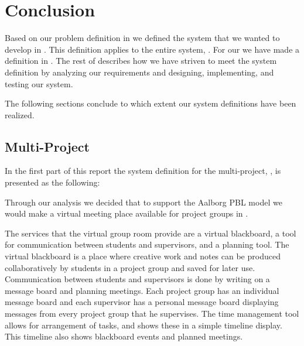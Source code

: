 \chapter{Conclusion}
\label{chap:conclusion}
%
Based on our problem definition in  we defined the system that we wanted to develop in .
This definition applies to the entire system, \system{}.
For our \subsystem{} we have made a definition in . 
The rest of  describes how we have striven to meet the system definition by analyzing our requirements and designing,  implementing, and testing our system.

The following sections conclude to which extent our system definitions have been realized.

\section{Multi-Project}
\label{sec:multiconclusion}
In the first part of this report the system definition for the multi-project, \system{}, is presented as the following: 



Through our analysis we decided that to support the Aalborg PBL model we would make a virtual meeting place available for project groups in \moodle{}.

The services that the virtual group room provide are a virtual blackboard, a tool for communication between students and supervisors, and a planning tool.
The virtual blackboard is a place where creative work and notes can be produced collaboratively by students in a project group and saved for later use.
Communication between students and supervisors is done by writing on a message board and planning meetings.
Each project group has an individual message board and each supervisor has a personal message board displaying messages from every project group that he supervises.
The time management tool allows for arrangement of tasks, and shows these in a simple timeline display.
This timeline also shows blackboard events and planned meetings.

